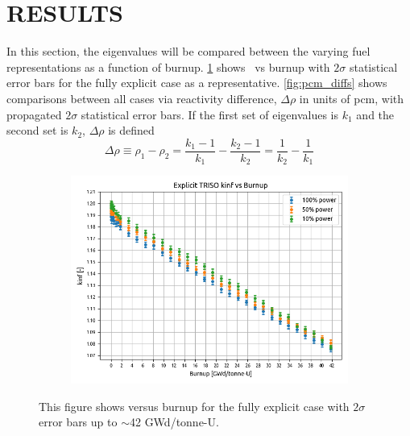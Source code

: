 \documentclass[letterpaper]{physor2024}
\begin{document}
\section{RESULTS}\label{sec:results}
In this section, the eigenvalues will be compared between the varying fuel representations as a function of burnup. \cref{fig:kinf_full_explicit_results} shows \kinf~vs burnup with $2\sigma$ statistical error bars for the fully explicit case as a representative. \cref{fig:pcm_diffs} shows comparisons between all cases via reactivity difference, $\Delta \rho$ in units of \gls{pcm}, with propagated $2\sigma$ statistical error bars. If the first set of eigenvalues is $k_ 1$ and the second set is  $k_2$, $\Delta \rho$ is defined
\begin{equation}
    \Delta \rho \equiv
    \rho_1 - \rho_2 =
    \frac{k_1-1}{k_1} - \frac{k_2 - 1 }{k_2} =
    \frac{1}{k_2} - \frac{1}{k_1}
\end{equation}
\vspace{-0.4cm}
\begin{figure}[!h]
    \centering
    \begin{subfigure}{0.6\linewidth}
        \centering
        \includegraphics[width=\linewidth]{figures/expl_kinf_vs_bu.png}
    \end{subfigure}
    \caption{This figure shows \kinf versus burnup for the fully explicit case with $2\sigma$ error bars up to $\sim$42 GWd/tonne-U.}
    \label{fig:kinf_full_explicit_results}
\end{figure}
\end{document}
